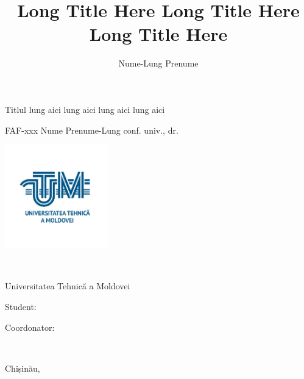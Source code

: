 \title
    {Long Title Here Long Title Here Long Title Here}
    {Titlul lung aici lung aici lung aici lung aici}
\author
    {Nume-Lung Prenume}
    {FAF-xxx}
\supervisor
    {Nume Prenume-Lung}
    {conf. univ., dr.}


\begin{titlepage}

    \begin{minipage}{0.3\textwidth}
        \includegraphics[height=4.5cm]{cover/utmlogo.jpg}
    \end{minipage}
    ~
    \begin{minipage}{0.65\textwidth}
        {\Large Universitatea Tehnică a Moldovei}
    \end{minipage}
	
	\vfill
	
	{\LARGE \titleen \par}
    {\LARGE \titlero \par}
	
	\vfill
	
	\hfill
    \begin{minipage}{0.2\textwidth}
        \raggedright
        {\Large Student: \par}
        \bigskip
        {\Large Coordonator: \par}
        {\Large \quad \par}
    \end{minipage}
    ~
    \begin{minipage}{0.5\textwidth}
        \raggedleft
        {\Large \authorname \par}
        \bigskip
        {\Large \supername \par}
        {\Large \supertitle \par}
    \end{minipage}
	
	\vfill

	{\Large Chișinău, \degreeyear \par}

\end{titlepage}
